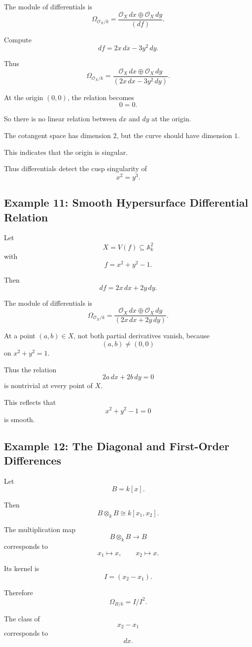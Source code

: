 \documentclass[12pt,a4paper]{article}
\theoremstyle{notespace}
\begin{document}
The module of differentials is
\[
\Omega_{\mathcal O_X/k}
=
\frac{\mathcal O_X\,dx\oplus\mathcal O_X\,dy}
{(df)}.
\]

Compute
\[
df=2x\,dx-3y^2\,dy.
\]

Thus
\[
\Omega_{\mathcal O_X/k}
=
\frac{\mathcal O_X\,dx\oplus\mathcal O_X\,dy}
{(2x\,dx-3y^2\,dy)}.
\]

At the origin $(0,0)$, the relation becomes
\[
0=0.
\]

So there is no linear relation between $dx$ and $dy$ at the origin.

The cotangent space has dimension $2$, but the curve should have dimension
$1$.

This indicates that the origin is singular.

Thus differentials detect the cusp singularity of
\[
x^2=y^3.
\]

\subsection{Example 11: Smooth Hypersurface Differential Relation}

Let
\[
X=V(f)\subseteq\mathbb A_k^2
\]
with
\[
f=x^2+y^2-1.
\]

Then
\[
df=2x\,dx+2y\,dy.
\]

The module of differentials is
\[
\Omega_{\mathcal O_X/k}
=
\frac{\mathcal O_X\,dx\oplus\mathcal O_X\,dy}
{(2x\,dx+2y\,dy)}.
\]

At a point $(a,b)\in X$, not both partial derivatives vanish, because
\[
(a,b)\neq(0,0)
\]
on $x^2+y^2=1$.

Thus the relation
\[
2a\,dx+2b\,dy=0
\]
is nontrivial at every point of $X$.

This reflects that
\[
x^2+y^2-1=0
\]
is smooth.

\subsection{Example 12: The Diagonal and First-Order Differences}

Let
\[
B=k[x].
\]

Then
\[
B\otimes_k B
\cong
k[x_1,x_2].
\]

The multiplication map
\[
B\otimes_k B\to B
\]
corresponds to
\[
x_1\mapsto x,
\qquad
x_2\mapsto x.
\]

Its kernel is
\[
I=(x_2-x_1).
\]

Therefore
\[
\Omega_{B/k}=I/I^2.
\]

The class of
\[
x_2-x_1
\]
corresponds to
\[
dx.
\]
\end{document}
